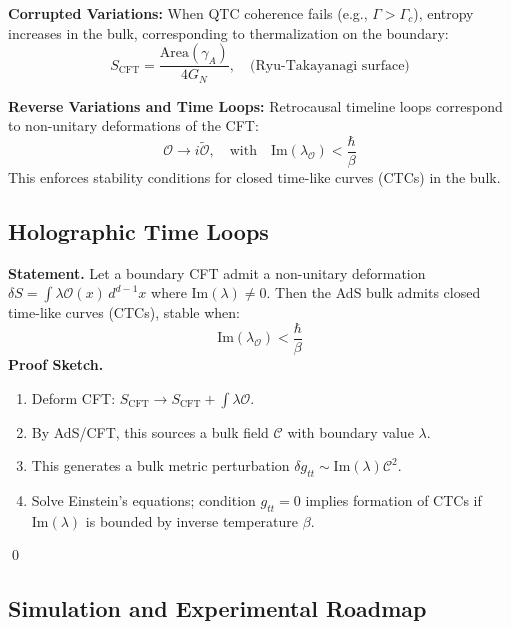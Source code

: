 \documentclass{article}
\theoremstyle{plain}
\theoremstyle{claimstyle}
\begin{document}
\textbf{Corrupted Variations:} When QTC coherence fails (e.g., \( \Gamma > \Gamma_c \)), entropy increases in the bulk, corresponding to thermalization on the boundary:
\begin{equation}
S_{\text{CFT}} = \frac{\text{Area}(\gamma_A)}{4 G_N}, \quad \text{(Ryu-Takayanagi surface)}
\end{equation}

\textbf{Reverse Variations and Time Loops:} Retrocausal timeline loops correspond to non-unitary deformations of the CFT:
\begin{equation}
\mathcal{O} \to i \tilde{\mathcal{O}}, \quad \text{with} \quad \text{Im}(\lambda_{\mathcal{O}}) < \frac{\hbar}{\beta}
\end{equation}
This enforces stability conditions for closed time-like curves (CTCs) in the bulk.

\subsection{Holographic Time Loops}

\textbf{Statement.} Let a boundary CFT admit a non-unitary deformation \( \delta S = \int \lambda \mathcal{O}(x)\, d^{d-1}x \) where \( \text{Im}(\lambda) \neq 0 \). Then the AdS bulk admits closed time-like curves (CTCs), stable when:
\begin{equation}
\text{Im}(\lambda_{\mathcal{O}}) < \frac{\hbar}{\beta}
\end{equation}
\textbf{Proof Sketch.}
\begin{enumerate}
    \item Deform CFT: \( S_{\text{CFT}} \rightarrow S_{\text{CFT}} + \int \lambda \mathcal{O} \).
    \item By AdS/CFT, this sources a bulk field \( \mathcal{C} \) with boundary value \( \lambda \).
    \item This generates a bulk metric perturbation \( \delta g_{tt} \sim \text{Im}(\lambda) \mathcal{C}^2 \).
    \item Solve Einstein's equations; condition \( g_{tt} = 0 \) implies formation of CTCs if \( \text{Im}(\lambda) \) is bounded by inverse temperature \( \beta \).
\end{enumerate}
\qed

\subsection{Simulation and Experimental Roadmap}
\end{document}
